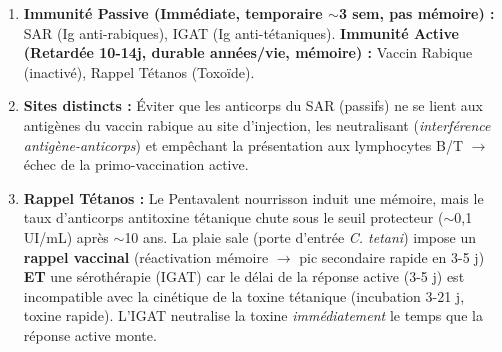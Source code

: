 \documentclass[11pt]{article}
\begin{document}
\begin{corrige}
\begin{enumerate}
    \item \textbf{Immunité Passive (Immédiate, temporaire $\sim$3 sem, pas mémoire) :} SAR (Ig anti-rabiques), IGAT (Ig anti-tétaniques). \textbf{Immunité Active (Retardée 10-14j, durable années/vie, mémoire) :} Vaccin Rabique (inactivé), Rappel Tétanos (Toxoïde).
    \item \textbf{Sites distincts :} Éviter que les anticorps du SAR (passifs) ne se lient aux antigènes du vaccin rabique au site d'injection, les neutralisant (\emph{interférence antigène-anticorps}) et empêchant la présentation aux lymphocytes B/T $\rightarrow$ échec de la primo-vaccination active.
    \item \textbf{Rappel Tétanos :} Le Pentavalent nourrisson induit une mémoire, mais le taux d'anticorps antitoxine tétanique chute sous le seuil protecteur ($\sim$0,1 UI/mL) après $\sim$10 ans. La plaie sale (porte d'entrée \emph{C. tetani}) impose un \textbf{rappel vaccinal} (réactivation mémoire $\rightarrow$ pic secondaire rapide en 3-5 j) \textbf{ET} une sérothérapie (IGAT) car le délai de la réponse active (3-5 j) est incompatible avec la cinétique de la toxine tétanique (incubation 3-21 j, toxine rapide). L'IGAT neutralise la toxine \emph{immédiatement} le temps que la réponse active monte.
\end{enumerate}
\end{corrige}
\end{document}
